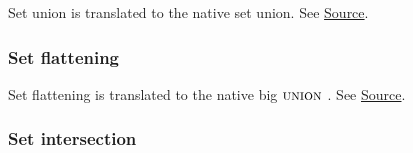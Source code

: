 \begin{mathpar}
\end{mathpar}

Set union is translated to the \tlap{} native set union.  See
\href{https://github.com/saltiniroberto/ssf/blob/7ea6e18093d9da3154b4e396dd435549f687e6b9/high_level/common/pythonic_code_generic.py#L31-L32}{Source}.

\subsubsection{ Set flattening}


\begin{mathpar}
\end{mathpar}

Set flattening is translated to the \tlap{} native big $\UNION$.  See
\href{https://github.com/saltiniroberto/ssf/blob/7ea6e18093d9da3154b4e396dd435549f687e6b9/high_level/common/pythonic_code_generic.py#L35-L36}{Source}.

\subsubsection{Set intersection}


\begin{mathpar}
\end{mathpar}

